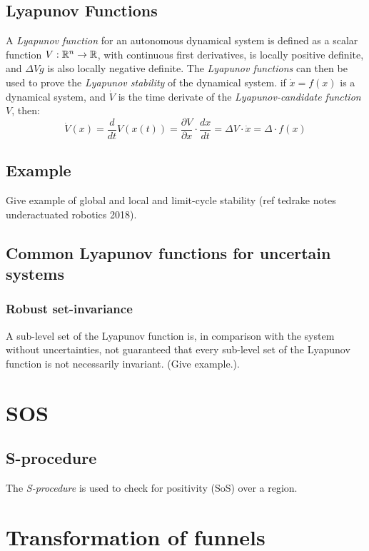 \subsection{Lyapunov Functions}

A \textit{Lyapunov function} for an autonomous dynamical system is defined as a
scalar function \(V: \mathbb{R}^n \rightarrow \mathbb{R}\), with continuous first derivatives,
is locally positive definite, and \(\Delta V \dot g\) is also locally negative
definite. The \textit{Lyapunov functions} can then be used to prove the
\textit{Lyapunov stability} of the dynamical system. if \(\dot{x} = f(x)\) is a
dynamical system, and \(\dot{V}\) is the time derivate of the
\textit{Lyapunov-candidate function} \(V\), then:
\[
  \dot{V}(x) = \frac{d}{dt}V(x(t)) = \frac{\partial V}{\partial x} \cdot
  \frac{dx}{dt} = \Delta V \cdot \dot{x} = \Delta \cdot f(x)
\]

\subsection{Example}
Give example of global and local and limit-cycle stability (ref tedrake notes
underactuated robotics 2018).

\subsection{Common Lyapunov functions for uncertain systems}
\subsubsection{Robust set-invariance}

A sub-level set of the Lyapunov function is, in comparison with the system
without uncertainties, not guaranteed that every sub-level set of the Lyapunov
function is not necessarily invariant. (Give example.).

\section{SOS}

\subsection{S-procedure}

The \textit{S-procedure} is used to check for positivity (SoS) over a region.

\section{Transformation of funnels}

